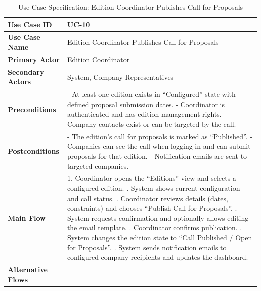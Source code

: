 \newpage
\renewcommand{\arraystretch}{1.5} 
\begin{xltabular}{\textwidth}{|l|X|}
    \caption{Use Case Specification: Edition Coordinator Publishes Call for Proposals} \label{tab:UC-10} \\
    
    \hline
    \textbf{Use Case ID} & UC-10 \\ \hline
    \textbf{Use Case Name} & Edition Coordinator Publishes Call for Proposals \\ \hline
    \textbf{Primary Actor} & Edition Coordinator \\ \hline
    \textbf{Secondary Actors} & System, Company Representatives \\ \hline
    \textbf{Preconditions} &
        - At least one edition exists in “Configured” state with defined proposal submission dates. \newline
        - Coordinator is authenticated and has edition management rights. \newline
        - Company contacts exist or can be targeted by the call.
        \\ \hline
    \textbf{Postconditions} &
        - The edition’s call for proposals is marked as “Published”. \newline
        - Companies can see the call when logging in and can submit proposals for that edition. \newline
        - Notification emails are sent to targeted companies.
        \\ \hline
    \textbf{Main Flow} &
        1. Coordinator opens the “Editions” view and selects a configured edition. . System shows current configuration and call status. . Coordinator reviews details (dates, constraints) and chooses “Publish Call for Proposals”. . System requests confirmation and optionally allows editing the email template. . Coordinator confirms publication. . System changes the edition state to “Call Published / Open for Proposals”. . System sends notification emails to configured company recipients and updates the dashboard. \\ \hline
    \textbf{Alternative Flows} &

\end{xltabular}
